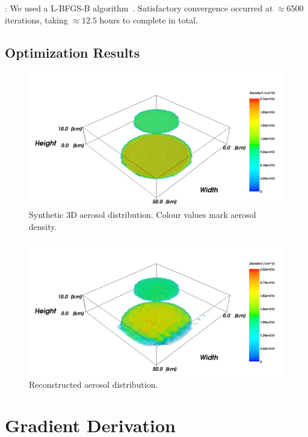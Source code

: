 \documentclass[10pt,twocolumn,letterpaper]{article}
\begin{document}
: We used a L-BFGS-B algorithm~\cite{BFGS}.
Satisfactory convergence occurred at $\approx 6500$ iterations, taking $\approx 12.5$ hours to complete in total.




\subsection{Optimization Results}
\label{sec:optimization-results}


\begin{figure}
  \centering
    \includegraphics[width=\columnwidth]{images/original}
  \caption{Synthetic 3D aerosol distribution. Colour values mark
    aerosol density.}
  \label{fig:synth-atmo}
\end{figure}

\begin{figure}
  \centering
    \includegraphics[width=\columnwidth]{images/reconstructed}
  \caption{Reconstructed aerosol distribution.}
  \label{fig:synth-result}
\end{figure}

\appendix

\section{Gradient Derivation}
\label{sec:gradient-derivation}
\end{document}
